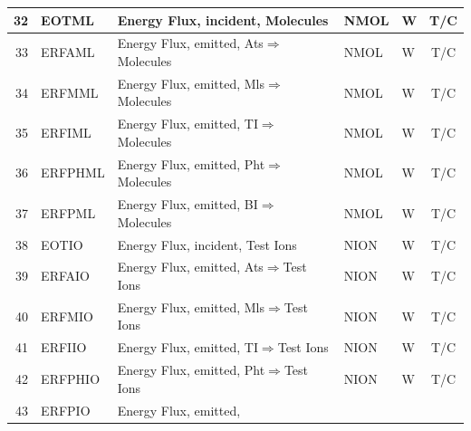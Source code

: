 \begin{landscape}
\begin{longtable}{|r|l|l|l|l|c|}
    32                       & EOTML                  & Energy Flux, incident,
    Molecules                & NMOL
                             & \si{\watt}             & T/C
    \\    \hline
    33                       & ERFAML                 & Energy Flux, emitted,
    \ac{Ats}$\Rightarrow$Molecules   & NMOL                   & \si{\watt}                    & T/C
    \\
    \hline
    34                       & ERFMML                 & Energy Flux, emitted,
    \ac{Mls}$\Rightarrow$Molecules   & NMOL                   & \si{\watt}                    & T/C
    \\
    \hline
    35                       & ERFIML                 & Energy Flux, emitted,
    \ac{TI}$\Rightarrow$Molecules   & NMOL                   & \si{\watt}                    & T/C
    \\
    \hline
    36                       & ERFPHML                & Energy Flux, emitted,
    \ac{Pht}$\Rightarrow$Molecules   & NMOL                   & \si{\watt}                    & T/C
    \\
    \hline
    37                       & ERFPML                 & Energy Flux, emitted,
    \ac{BI}$\Rightarrow$Molecules   & NMOL                   & \si{\watt}                    & T/C
    \\
    \hline
    38                       & EOTIO                  & Energy Flux, incident,
    Test Ions                & NION
                             & \si{\watt}             & T/C
    \\   \hline
    39                       & ERFAIO                 & Energy Flux, emitted,
    \ac{Ats}$\Rightarrow$Test Ions   & NION                   & \si{\watt}                    & T/C
    \\
    \hline
    40                       & ERFMIO                 & Energy Flux, emitted,
    \ac{Mls}$\Rightarrow$Test Ions   & NION                   & \si{\watt}                    & T/C
    \\
    \hline
    41                       & ERFIIO                 & Energy Flux, emitted,
    \ac{TI}$\Rightarrow$Test Ions   & NION                   & \si{\watt}                    & T/C
    \\
    \hline
    42                       & ERFPHIO                & Energy Flux, emitted,
    \ac{Pht}$\Rightarrow$Test Ions   & NION                   & \si{\watt}                    & T/C
    \\
    \hline
    43                       & ERFPIO                 & Energy Flux, emitted,

\end{longtable}
\end{landscape}
